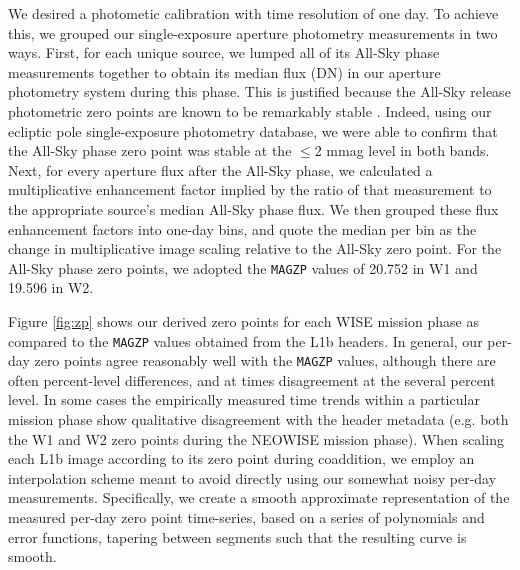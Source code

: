 \documentclass{emulateapj}
\begin{document}

\begin{figure*} [ht]
 \begin{center}
  \caption{\label{fig:zp} Summary of our custom photometric calibration. In 
           each panel, the red dashes give the per-day
           photometric zero points we derived based on repeat measurements
           of stars near the ecliptic poles, as described in 
           $\S$\ref{sec:calib}. The gray lines show the
           \texttt{MAGZP} zero point values provided by the L1b header 
           metadata. The magenta (green) dashes
           represent the zero point time trends which would have resulted had
           we restricted our analysis to aperture photometry of only the north 
           (south) ecliptic pole.}
 \end{center}
\end{figure*}

We desired a photometic calibration with time resolution of one day. To
achieve this, we grouped our single-exposure aperture photometry measurements 
in two ways. First, for each 
unique source, we lumped all of its All-Sky phase measurements together to 
obtain its median flux (DN) in our aperture photometry system during this 
phase. This is justified because the All-Sky release photometric zero points 
are known to be remarkably stable \citep{jarrett11}. Indeed, using our ecliptic
pole single-exposure photometry database, we were able to confirm that the 
All-Sky phase zero point was stable at the $\le$2 mmag level in both bands. 
Next, for every aperture flux after the All-Sky phase, we calculated a 
multiplicative enhancement factor
implied by the ratio of that measurement to the appropriate source's
median All-Sky phase flux. We then grouped these 
flux enhancement factors into one-day bins, and quote the median per 
bin as the change in multiplicative
image scaling relative to the All-Sky zero point. For the  
All-Sky phase zero points, we adopted the \verb|MAGZP| values of 20.752 in W1 
and 19.596 in W2.

Figure \ref{fig:zp} shows our derived zero points for each WISE mission phase 
as compared to the \verb|MAGZP| values obtained from the L1b headers.  
In general, our per-day zero points agree reasonably
well with the \verb|MAGZP| values, although there are often 
percent-level differences, and at times disagreement at the several percent
level. In some cases the empirically measured time trends within a particular 
mission phase show qualitative disagreement with the header metadata (e.g. both
the W1 and W2 zero points during the NEOWISE mission phase). When scaling each
L1b image according to its zero point during coaddition, we employ an 
interpolation scheme meant to avoid directly using our somewhat noisy per-day 
measurements. Specifically, we create a smooth approximate representation of 
the measured per-day zero point time-series, based on a series of polynomials 
and error functions, tapering between segments such that the resulting curve is
smooth.
\end{document}
